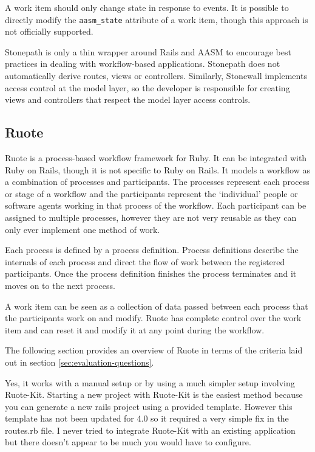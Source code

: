 
A work item should only change state in response to events. It is possible to directly modify the \verb!aasm_state! attribute of a work item, though this approach is not officially supported.


Stonepath is only a thin wrapper around Rails and AASM to encourage best practices in dealing with workflow-based applications. Stonepath does not automatically derive routes, views or controllers. Similarly, Stonewall implements access control at the model layer, so the developer is responsible for creating views and controllers that respect the model layer access controls.


\subsection {Ruote}
Ruote is a process-based workflow framework for Ruby. It can be integrated with Ruby on Rails, though it is not specific to Ruby on Rails. It models a workflow as a combination of processes and participants. The processes represent each process or stage of a workflow and the participants represent the ‘individual’ people or software agents working in that process of the workflow. Each participant can be assigned to multiple processes, however they are not very reusable as they can only ever implement one method of work.

Each process is defined by a process definition. Process definitions describe the internals of each process and direct the flow of work between the registered participants. Once the process definition finishes the process terminates and it moves on to the next process.

A work item can be seen as a collection of data passed between each process that the participants work on and modify. Ruote has complete control over the work item and can reset it and modify it at any point during the workflow.

The following section provides an overview of Ruote in terms of the criteria laid out in section \ref{sec:evaluation-questions}.


Yes, it works with a manual setup or by using a much simpler setup involving Ruote-Kit. Starting a new project with Ruote-Kit is the easiest method because you can generate a new rails project using a provided template. However this template has not been updated for 4.0 so it required a very simple fix in the routes.rb file. I never tried to integrate Ruote-Kit with an existing application but there doesn’t appear to be much you would have to configure.

